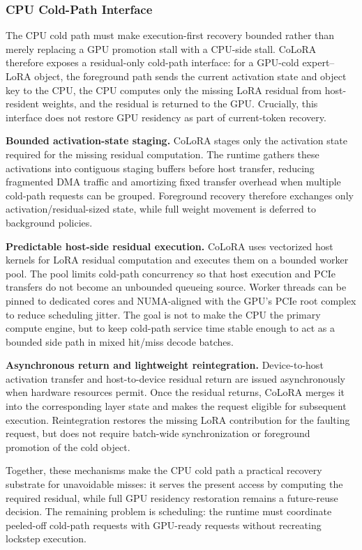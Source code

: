 \documentclass[sigplan,anonymous,review,10pt]{acmart}
\begin{document}
\subsubsection{CPU Cold-Path Interface}
\label{subsec:cpu-cold-path}

The CPU cold path must make execution-first recovery bounded rather than merely replacing a GPU promotion stall with a CPU-side stall. CoLoRA therefore exposes a residual-only cold-path interface: for a GPU-cold expert--LoRA object, the foreground path sends the current activation state and object key to the CPU, the CPU computes only the missing LoRA residual from host-resident weights, and the residual is returned to the GPU. Crucially, this interface does not restore GPU residency as part of current-token recovery.

\noindent\textbf{Bounded activation-state staging.}
CoLoRA stages only the activation state required for the missing residual computation. The runtime gathers these activations into contiguous staging buffers before host transfer, reducing fragmented DMA traffic and amortizing fixed transfer overhead when multiple cold-path requests can be grouped. Foreground recovery therefore exchanges only activation/residual-sized state, while full weight movement is deferred to background policies.

\noindent\textbf{Predictable host-side residual execution.}
CoLoRA uses vectorized host kernels for LoRA residual computation and executes them on a bounded worker pool. The pool limits cold-path concurrency so that host execution and PCIe transfers do not become an unbounded queueing source. Worker threads can be pinned to dedicated cores and NUMA-aligned with the GPU's PCIe root complex to reduce scheduling jitter. The goal is not to make the CPU the primary compute engine, but to keep cold-path service time stable enough to act as a bounded side path in mixed hit/miss decode batches.

\noindent\textbf{Asynchronous return and lightweight reintegration.}
Device-to-host activation transfer and host-to-device residual return are issued asynchronously when hardware resources permit. Once the residual returns, CoLoRA merges it into the corresponding layer state and makes the request eligible for subsequent execution. Reintegration restores the missing LoRA contribution for the faulting request, but does not require batch-wide synchronization or foreground promotion of the cold object.

Together, these mechanisms make the CPU cold path a practical recovery substrate for unavoidable misses: it serves the present access by computing the required residual, while full GPU residency restoration remains a future-reuse decision. The remaining problem is scheduling: the runtime must coordinate peeled-off cold-path requests with GPU-ready requests without recreating lockstep execution.
\end{document}
